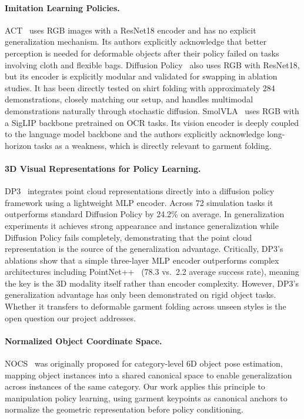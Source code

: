 \paragraph{Imitation Learning Policies.}
ACT~\cite{zhao2023act} uses RGB images with a ResNet18 encoder and has no explicit generalization mechanism. Its authors explicitly acknowledge that better perception is needed for deformable objects after their policy failed on tasks involving cloth and flexible bags. Diffusion Policy~\cite{chi2023diffusionpolicy} also uses RGB with ResNet18, but its encoder is explicitly modular and validated for swapping in ablation studies. It has been directly tested on shirt folding with approximately 284 demonstrations, closely matching our setup, and handles multimodal demonstrations naturally through stochastic diffusion. SmolVLA~\cite{smolvla2025} uses RGB with a SigLIP backbone pretrained on OCR tasks. Its vision encoder is deeply coupled to the language model backbone and the authors explicitly acknowledge long-horizon tasks as a weakness, which is directly relevant to garment folding.

\paragraph{3D Visual Representations for Policy Learning.}
DP3~\cite{ze2024dp3} integrates point cloud representations directly into a diffusion policy framework using a lightweight MLP encoder. Across 72 simulation tasks it outperforms standard Diffusion Policy by 24.2\% on average. In generalization experiments it achieves strong appearance and instance generalization while Diffusion Policy fails completely, demonstrating that the point cloud representation is the source of the generalization advantage. Critically, DP3's ablations show that a simple three-layer MLP encoder outperforms complex architectures including PointNet++~\cite{qi2017pointnet2} (78.3 vs.\ 2.2 average success rate), meaning the key is the 3D modality itself rather than encoder complexity. However, DP3's generalization advantage has only been demonstrated on rigid object tasks. Whether it transfers to deformable garment folding across unseen styles is the open question our project addresses.

\paragraph{Normalized Object Coordinate Space.}
NOCS~\cite{wang2019normalized} was originally proposed for category-level 6D object pose estimation, mapping object instances into a shared canonical space to enable generalization across instances of the same category. Our work applies this principle to manipulation policy learning, using garment keypoints as canonical anchors to normalize the geometric representation before policy conditioning.
